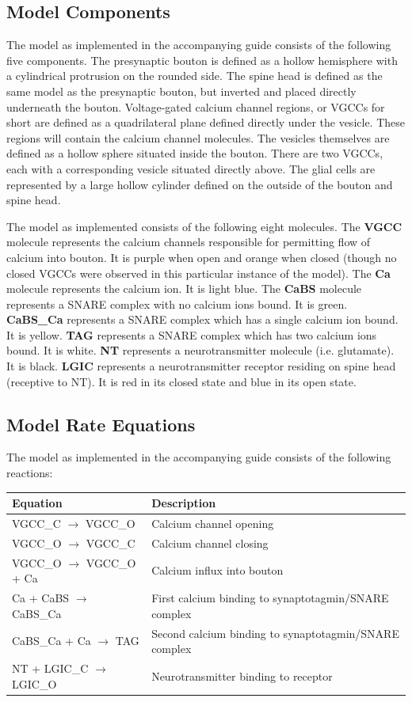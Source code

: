 \documentclass[a4paper]{article}
\begin{document}
\subsection{Model Components}
The model as implemented in the accompanying guide consists of the following five components. The presynaptic bouton is defined as a hollow hemisphere with a cylindrical protrusion on the rounded side. The spine head is defined as the same model as the presynaptic bouton, but inverted and placed directly underneath the bouton. Voltage-gated calcium channel regions, or VGCCs for short are defined as a  quadrilateral plane defined directly under the vesicle. These regions will contain the calcium channel molecules. The vesicles themselves are defined as a hollow sphere situated inside the bouton. There are two VGCCs, each with a corresponding vesicle situated directly above. The glial cells are represented by a large hollow cylinder defined on the outside of the bouton and spine head.

The model as implemented consists of the following eight molecules. The \textbf{VGCC} molecule represents the calcium channels responsible for permitting flow of calcium into bouton. It is purple when open and orange when closed (though no closed VGCCs were observed in this particular instance of the model). The \textbf{Ca} molecule represents the calcium ion. It is light blue. The \textbf{CaBS} molecule represents a SNARE complex with no calcium ions bound. It is green. \textbf{CaBS\_Ca} represents a SNARE complex which has a single calcium ion bound. It is yellow. \textbf{TAG} represents a SNARE complex which has two calcium ions bound. It is white. \textbf{NT} represents a neurotransmitter molecule (i.e. glutamate). It is black. \textbf{LGIC} represents a neurotransmitter receptor residing on spine head (receptive to NT). It is red in its closed state and blue in its open state.

\subsection{Model Rate Equations}
The model as implemented in the accompanying guide consists of the following reactions:
\begin{table}[H]
\begin{tabular}{ll}
Equation & Description \\ \hline
VGCC\_C $\to$ VGCC\_O & Calcium channel opening \\
VGCC\_O $\to$ VGCC\_C & Calcium channel closing \\
VGCC\_O $\to$ VGCC\_O + Ca & Calcium influx into bouton \\
Ca + CaBS $\to$ CaBS\_Ca & First calcium binding to synaptotagmin/SNARE complex  \\ 
CaBS\_Ca + Ca $\to$ TAG & Second calcium binding to synaptotagmin/SNARE complex  \\
NT + LGIC\_C $\to$ LGIC\_O& Neurotransmitter binding to receptor \\
\end{tabular} 
\end{table}
\end{document}
